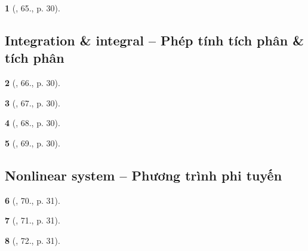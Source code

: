 \documentclass{article}
\newtheorem{baitoan}{}
\begin{document}
\begin{baitoan}[\cite{Doanh_Tuan_Pascal}, 65., p. 30]
	
\end{baitoan}


\subsection{Integration \& integral -- Phép tính tích phân \& tích phân}

\begin{baitoan}[\cite{Doanh_Tuan_Pascal}, 66., p. 30]
	
\end{baitoan}

\begin{baitoan}[\cite{Doanh_Tuan_Pascal}, 67., p. 30]
	
\end{baitoan}

\begin{baitoan}[\cite{Doanh_Tuan_Pascal}, 68., p. 30]
	
\end{baitoan}

\begin{baitoan}[\cite{Doanh_Tuan_Pascal}, 69., p. 30]
	
\end{baitoan}


\subsection{Nonlinear system -- Phương trình phi tuyến}

\begin{baitoan}[\cite{Doanh_Tuan_Pascal}, 70., p. 31]
	
\end{baitoan}

\begin{baitoan}[\cite{Doanh_Tuan_Pascal}, 71., p. 31]
	
\end{baitoan}

\begin{baitoan}[\cite{Doanh_Tuan_Pascal}, 72., p. 31]
	
\end{baitoan}
\end{document}
